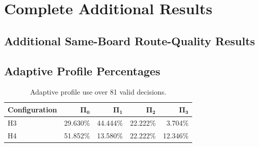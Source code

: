 \chapter{Complete Additional Results}
\label{app:additional-results}

\section{Additional Same-Board Route-Quality Results}

\begin{table}[H]
\centering
\caption{Held-out status and route-quality summaries.}
\label{tab:utility-full}
\end{table}

\section{Adaptive Profile Percentages}

\begin{table}[H]
\centering
\caption{Adaptive profile use over 81 valid decisions.}
\label{tab:profile-percent}
\begin{tabular}{@{}lrrrr@{}}
\toprule
\textbf{Configuration} & $\boldsymbol{\Pi_0}$ & $\boldsymbol{\Pi_1}$ &
$\boldsymbol{\Pi_2}$ & $\boldsymbol{\Pi_3}$\\
\midrule
H3 & 29.630\% & 44.444\% & 22.222\% & 3.704\%\\
H4 & 51.852\% & 13.580\% & 22.222\% & 12.346\%\\
\bottomrule
\end{tabular}
\end{table}

